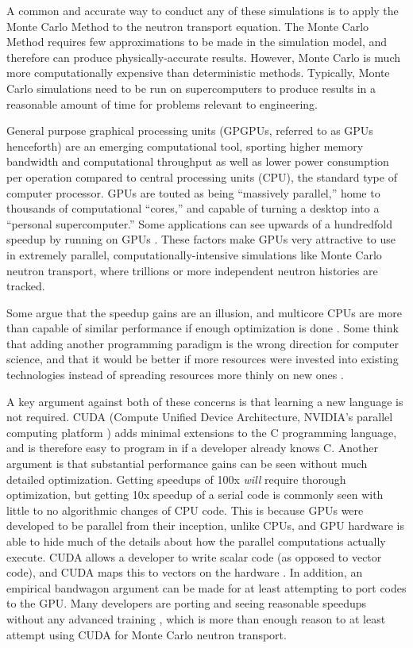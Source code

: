 A common and accurate way to conduct any of these simulations is to apply the Monte Carlo Method to the neutron transport equation.  The Monte Carlo Method requires few approximations to be made in the simulation model, and therefore can produce physically-accurate results.  However, Monte Carlo is much more computationally expensive than deterministic methods.  Typically, Monte Carlo simulations need to be run on supercomputers to produce results in a reasonable amount of time for problems relevant to engineering.

General purpose graphical processing units (GPGPUs, referred to as GPUs henceforth) are an emerging computational tool, sporting higher memory bandwidth and computational throughput as well as lower power consumption per operation compared to central processing units (CPU), the standard type of computer processor.  GPUs are touted as being ``massively parallel,'' home to thousands of computational ``cores,'' and capable of turning a desktop into a ``personal supercomputer.''  Some applications can see upwards of a hundredfold speedup by running on GPUs \cite{nvidia_speedups}. These factors make GPUs very attractive to use in extremely parallel, computationally-intensive simulations like Monte Carlo neutron transport, where trillions or more independent neutron histories are tracked.   

Some argue that the speedup gains are an illusion, and multicore CPUs are more than capable of similar performance if enough optimization is done \cite{debunk}. Some think that adding another programming paradigm is the wrong direction for computer science, and that it would be better if more resources were invested into existing technologies instead of spreading resources more thinly on new ones \cite{fewer_lang}.  

A key argument against both of these concerns is that learning a new language is not required. CUDA (Compute Unified Device Architecture, NVIDIA's parallel computing platform \cite{cuda}) adds minimal extensions to the C programming language, and is therefore easy to program in if a developer already knows C. Another argument is that substantial performance gains can be seen without much detailed optimization.  Getting speedups of 100x \emph{will} require thorough optimization, but getting 10x speedup of a serial code is commonly seen with little to no algorithmic changes of CPU code.  This is because GPUs were developed to be parallel from their inception, unlike CPUs, and GPU hardware is able to hide much of the details about how the parallel computations actually execute.  CUDA allows a developer to write scalar code (as opposed to vector code), and CUDA maps this to vectors on the hardware \cite{cuda}.  In addition, an empirical  bandwagon argument can be made for at least attempting to port codes to the GPU.  Many developers are porting and seeing reasonable speedups without any advanced training \cite{}, which is more than enough reason to at least attempt using CUDA for Monte Carlo neutron transport. 

